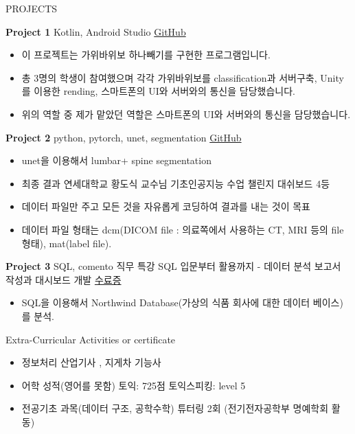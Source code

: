 \documentclass{resume} %
\begin{document}
\begin{rSection}{PROJECTS}
\vspace{-1.25em}
\item \textbf{Project 1} {Kotlin, Android Studio} \hfill \href{https://github.com/LeeGwanHui/Rock-Scissors-paper-kotlin}{GitHub}
\begin{itemize}
    \itemsep -3pt {} 
     \item 이 프로젝트는 가위바위보 하나빼기를 구현한 프로그램입니다. 
     \item 총 3명의 학생이 참여했으며 각각 가위바위보를 classification과 서버구축, Unity를 이용한 rending, 스마트폰의 UI와 서버와의 통신을 담당했습니다.
    \item 위의 역할 중 제가 맡았던 역할은 스마트폰의 UI와 서버와의 통신을 담당했습니다.
 \end{itemize}
\item \textbf{Project 2} {python, pytorch, unet, segmentation} \hfill \href{https://github.com/LeeGwanHui/lumbar}{GitHub}
\begin{itemize}
    \itemsep -3pt {} 
     \item unet을 이용해서 lumbar+ spine segmentation
     \item 최종 결과 연세대학교 황도식 교수님 기초인공지능 수업 챌린지 대쉬보드 4등
    \item 데이터 파일만 주고 모든 것을 자유롭게 코딩하여 결과를 내는 것이 목표 
    \item 데이터 파일 형태는 dcm(DICOM file : 의료쪽에서 사용하는 CT, MRI 등의 file 형태), mat(label file).
 \end{itemize}
\item \textbf{Project 3} {SQL, comento 직무 특강 SQL 입문부터 활용까지 - 데이터 분석 보고서 작성과 대시보드 개발 } \hfill \href{https://drive.google.com/file/d/1PEf-mlerQgi70gw5mVsfADWKnZp_6UBb/view?usp=sharing}{수료증}
\begin{itemize}
    \itemsep -3pt {} 
     \item SQL을 이용해서 Northwind Database(가상의 식품 회사에 대한 데이터 베이스)를 분석.
 \end{itemize}
\end{rSection} 

\begin{rSection}{Extra-Curricular Activities or certificate} 
\begin{itemize}
    \item 	정보처리 산업기사 , 지게차 기능사
    \item	어학 성적(영어를 못함) 토익: 725점 토익스피킹: level 5
    \item   전공기초 과목(데이터 구조, 공학수학) 튜터링 2회 (전기전자공학부 명예학회 활동)
\end{itemize}


\end{rSection}
\end{document}

